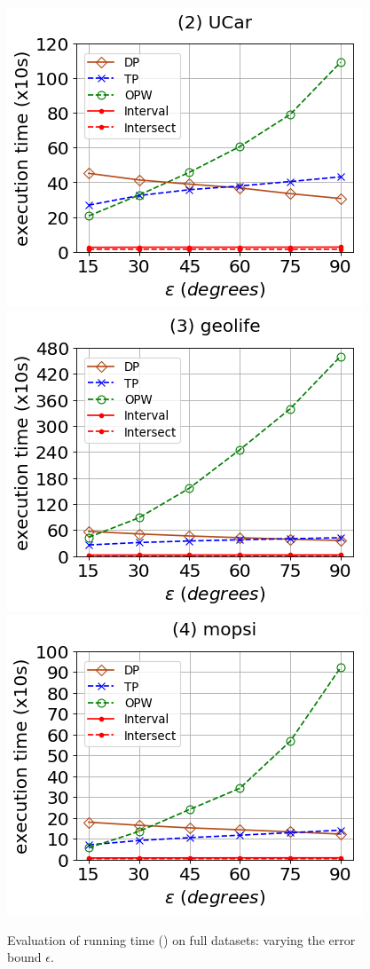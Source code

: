 \begin{figure}[tb!]
	\centering
	\includegraphics[scale=0.320]{Figures/Exp-DAD-time-epsilon-service.png} 	\hspace{3ex}
	\includegraphics[scale=0.320]{Figures/Exp-DAD-time-epsilon-geolife.png}	\hspace{3ex}
	\includegraphics[scale=0.320]{Figures/Exp-DAD-time-epsilon-mopsi.png}		
	\vspace{-2ex}
	\caption{\small Evaluation of running time (\dad) on full datasets: varying the error bound $\epsilon$.}\label{fig:time-epsilon-dad}
	\vspace{-2ex}
\end{figure}
